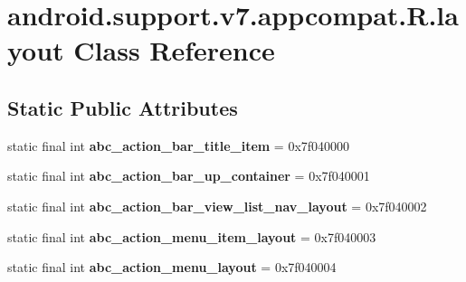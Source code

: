 \hypertarget{classandroid_1_1support_1_1v7_1_1appcompat_1_1_r_1_1layout}{}\section{android.\+support.\+v7.\+appcompat.\+R.\+layout Class Reference}
\label{classandroid_1_1support_1_1v7_1_1appcompat_1_1_r_1_1layout}
\subsection*{Static Public Attributes}
\begin{DoxyCompactItemize}
\item 
\hypertarget{classandroid_1_1support_1_1v7_1_1appcompat_1_1_r_1_1layout_aec65987e63e9073748bd15e578bfe898}{}static final int {\bfseries abc\+\_\+action\+\_\+bar\+\_\+title\+\_\+item} = 0x7f040000\label{classandroid_1_1support_1_1v7_1_1appcompat_1_1_r_1_1layout_aec65987e63e9073748bd15e578bfe898}

\item 
\hypertarget{classandroid_1_1support_1_1v7_1_1appcompat_1_1_r_1_1layout_aef35fa753f14bda2de42d62e894d5d48}{}static final int {\bfseries abc\+\_\+action\+\_\+bar\+\_\+up\+\_\+container} = 0x7f040001\label{classandroid_1_1support_1_1v7_1_1appcompat_1_1_r_1_1layout_aef35fa753f14bda2de42d62e894d5d48}

\item 
\hypertarget{classandroid_1_1support_1_1v7_1_1appcompat_1_1_r_1_1layout_ab2b3d6d1212d6aa5d21fd8d51a445bdd}{}static final int {\bfseries abc\+\_\+action\+\_\+bar\+\_\+view\+\_\+list\+\_\+nav\+\_\+layout} = 0x7f040002\label{classandroid_1_1support_1_1v7_1_1appcompat_1_1_r_1_1layout_ab2b3d6d1212d6aa5d21fd8d51a445bdd}

\item 
\hypertarget{classandroid_1_1support_1_1v7_1_1appcompat_1_1_r_1_1layout_a90577c306263ff0ba660407c3bb14473}{}static final int {\bfseries abc\+\_\+action\+\_\+menu\+\_\+item\+\_\+layout} = 0x7f040003\label{classandroid_1_1support_1_1v7_1_1appcompat_1_1_r_1_1layout_a90577c306263ff0ba660407c3bb14473}

\item 
\hypertarget{classandroid_1_1support_1_1v7_1_1appcompat_1_1_r_1_1layout_ae15076d5fd1b165883c87e6283dde5f9}{}static final int {\bfseries abc\+\_\+action\+\_\+menu\+\_\+layout} = 0x7f040004\label{classandroid_1_1support_1_1v7_1_1appcompat_1_1_r_1_1layout_ae15076d5fd1b165883c87e6283dde5f9}


\end{DoxyCompactItemize}
